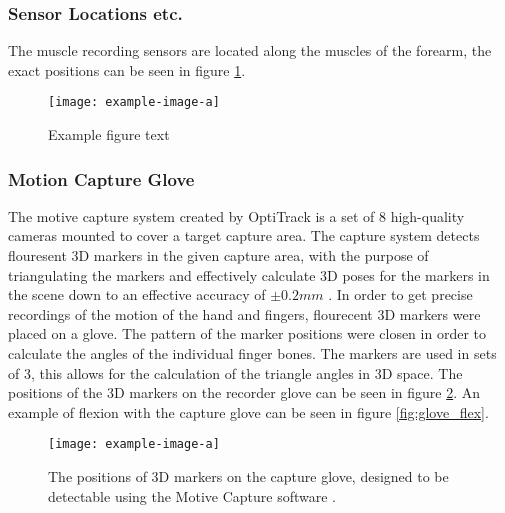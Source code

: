 \documentclass[../main.tex]{subfiles}
\begin{document}

\subsubsection{Sensor Locations etc.}

The muscle recording sensors are located along the muscles of the forearm, the exact positions can be seen in figure \ref{fig:musclesensors}.

\begin{figure}[h]
\begin{center}
\texttt{[image: example-image-a]}
\caption{Example figure text}
\label{fig:musclesensors}
\end{center}
\end{figure}


\subsubsection{Motion Capture Glove}

The motive capture system created by OptiTrack is a set of 8 high-quality cameras mounted to cover a target capture area.
The capture system detects flouresent 3D markers in the given capture area, with the purpose of triangulating the markers and effectively calculate 3D poses for the markers in the scene down to an effective accuracy of $\pm 0.2mm$ \cite{motive}.
In order to get precise recordings of the motion of the hand and fingers, flourecent 3D markers were placed on a glove.
The pattern of the marker positions were closen in order to calculate the angles of the individual finger bones.
The markers are used in sets of 3, this allows for the calculation of the triangle angles in 3D space.
The positions of the 3D markers on the recorder glove can be seen in figure \ref{fig:glove}.
An example of flexion with the capture glove can be seen in figure \ref{fig:glove_flex}.


\begin{center}
\begin{figure}[h]
\texttt{[image: example-image-a]}
\caption{The positions of 3D markers on the capture glove, designed to be detectable using the  Motive Capture software \cite{motive}.}
\label{fig:glove}
\end{figure}
\end{center}
\end{document}
